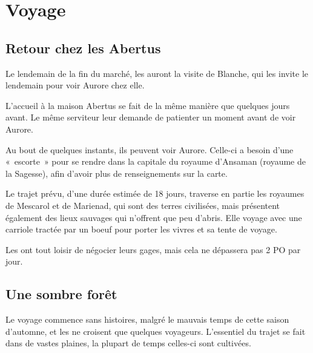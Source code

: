 \documentclass[a4paper,10pt,openany]{book}
\begin{document}
\chapter{Voyage}

\begin{multicols}{2}

\section{Retour chez les Abertus}
Le lendemain de la fin du marché, les \PJs auront la visite de Blanche, qui les invite le lendemain pour voir Aurore chez elle.\par L’accueil à la
maison Abertus se fait de la même manière que quelques jours avant. Le même serviteur leur demande de patienter un moment avant de voir Aurore.\par Au
bout de quelques instants, ils peuvent voir Aurore. Celle-ci a besoin d’une « escorte » pour se rendre dans la capitale du royaume d’Ansaman (royaume
de la Sagesse), afin d’avoir plus de renseignements sur la carte.\par Le trajet prévu, d’une durée estimée de 18 jours, traverse en partie les
royaumes de Mescarol et de Marienad, qui sont des terres civilisées, mais présentent également des lieux sauvages qui n’offrent que peu d’abris. Elle
voyage avec une carriole tractée par un boeuf pour porter les vivres et sa tente de voyage.\par Les \PJs ont tout loisir de négocier leurs gages, mais
cela ne dépassera pas 2 PO par jour.

\section{Une sombre forêt}
Le voyage commence sans histoires, malgré le mauvais temps de cette saison d’automne, et les \PJs ne croisent que quelques voyageurs. L’essentiel du
trajet se fait dans de vastes plaines, la plupart de temps celles-ci sont cultivées.


\end{multicols}
\end{document}
